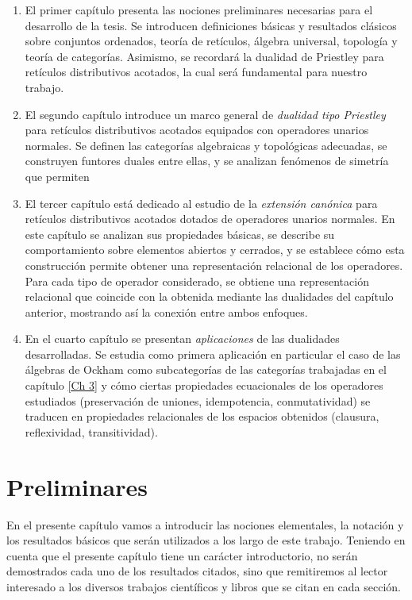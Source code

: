 \documentclass[12pt]{book}
\begin{document}
\begin{enumerate}[\normalfont 1)]

\item El primer capítulo presenta las nociones preliminares necesarias para el desarrollo de la tesis. Se introducen definiciones básicas y resultados clásicos sobre conjuntos ordenados, teoría de retículos, álgebra universal, topología y teoría de categorías. Asimismo, se recordará la dualidad de Priestley para retículos distributivos acotados, la cual será fundamental para nuestro trabajo.


\item El segundo capítulo introduce un marco general de \emph{dualidad tipo Priestley} para retículos distributivos acotados equipados con operadores unarios normales. Se definen las categorías algebraicas y topológicas adecuadas, se construyen funtores duales entre ellas, y se analizan fenómenos de simetría que permiten 


\item El tercer capítulo está dedicado al estudio de la \emph{extensión canónica} para retículos distributivos acotados dotados de operadores unarios normales. En este capítulo se analizan sus propiedades básicas, se describe su comportamiento sobre elementos abiertos y cerrados, y se establece cómo esta construcción permite obtener una representación relacional de los operadores. Para cada tipo de operador considerado, se obtiene una representación relacional que coincide con la obtenida mediante las dualidades del capítulo anterior, mostrando así la conexión entre ambos enfoques.


\item En el cuarto capítulo se presentan \emph{aplicaciones} de las dualidades desarrolladas. Se estudia como primera aplicación en particular el caso de las álgebras de Ockham como subcategorías de las categorías trabajadas en el capítulo \ref{Ch 3} y cómo ciertas propiedades ecuacionales de los operadores estudiados (preservación de uniones, idempotencia, conmutatividad) se
traducen en propiedades relacionales de los espacios obtenidos (clausura, reflexividad, transitividad).


\end{enumerate}

\chapter{Preliminares}

En el presente capítulo vamos a introducir las nociones elementales, la notación y los resultados básicos que serán utilizados a los largo de este trabajo. Teniendo en cuenta que el presente capítulo tiene un carácter introductorio, no serán demostrados cada uno de los resultados citados, sino que remitiremos al lector interesado a los diversos trabajos científicos y libros que se citan en cada sección.
\end{document}
